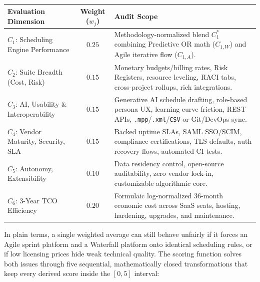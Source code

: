 \begin{table}[H]
\centering
\footnotesize
\setlength{\tabcolsep}{4.5pt}
\renewcommand{\arraystretch}{1.15}
\begin{tabularx}{\textwidth}{>{\raggedright\arraybackslash}p{4.5cm} c >{\raggedright\arraybackslash}X}
\toprule
\textbf{Evaluation Dimension} & \textbf{Weight ($w_j$)} & \textbf{Audit Scope} \\
\midrule
$C_1$: Scheduling Engine Performance & $0.25$ & Methodology-normalized blend $C_1^*$ combining Predictive OR math ($C_{1,W}$) and Agile iterative flow ($C_{1,A}$). \\
$C_2$: Suite Breadth (Cost, Risk) & $0.15$ & Monetary budgets/billing rates, Risk Registers, resource leveling, RACI tabs, cross-project rollups, rich integrations. \\
$C_3$: AI, Usability \& Interoperability & $0.15$ & Generative AI schedule drafting, role-based persona UX, learning curve friction, REST APIs, \texttt{.mpp}/\texttt{.xml}/\texttt{CSV} or Git/DevOps sync. \\
$C_4$: Vendor Maturity, Security, SLA & $0.15$ & Backed uptime SLAs, SAML SSO/SCIM, compliance certifications, TLS defaults, auth recovery flows, automated CI tests. \\
$C_5$: Autonomy, Extensibility & $0.10$ & Data residency control, open-source auditability, zero vendor lock-in, customizable algorithmic core. \\
$C_6$: 3-Year TCO Efficiency & $0.20$ & Formulaic log-normalized 36-month economic cost across SaaS seats, hosting, hardening, upgrades, and maintenance. \\
\bottomrule
\end{tabularx}
\end{table}

\vspace{2mm}

In plain terms, a single weighted average can still behave unfairly if it forces an Agile sprint platform and a Waterfall platform onto identical scheduling rules, or if low licensing prices hide weak technical quality. The scoring function solves both issues through five sequential, mathematically closed transformations that keep every derived score inside the $[0, 5]$ interval:

